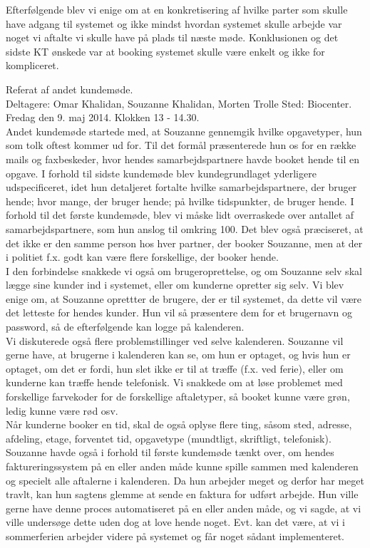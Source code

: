 \documentclass[12pt]{article}   %
\begin{document}
Efterfølgende blev vi enige om at en konkretisering af hvilke parter som skulle have adgang til systemet og ikke mindst hvordan systemet skulle arbejde var noget vi aftalte vi skulle have på plads til næste møde. Konklusionen og det sidste KT ønskede var at booking systemet skulle være enkelt og ikke for kompliceret. 

\newpage

Referat af andet kundemøde.\\

Deltagere: Omar Khalidan, Souzanne Khalidan, Morten Trolle
Sted: Biocenter. Fredag den 9. maj 2014. Klokken 13 - 14.30.\\

Andet kundemøde startede med, at Souzanne gennemgik hvilke opgavetyper, hun som tolk oftest kommer ud for. Til det formål præsenterede hun os for en række mails og faxbeskeder, hvor hendes samarbejdspartnere havde booket hende til en opgave. I forhold til sidste kundemøde blev kundegrundlaget yderligere udspecificeret, idet hun detaljeret fortalte hvilke samarbejdspartnere, der bruger hende; hvor mange, der bruger hende; på hvilke tidspunkter, de bruger hende. I forhold til det første kundemøde, blev vi måske lidt overraskede over antallet af samarbejdspartnere, som hun anslog til omkring 100. Det blev også præciseret, at det ikke er den samme person hos hver partner, der booker Souzanne, men at der i politiet f.x. godt kan være flere forskellige, der booker hende. \\
I den forbindelse snakkede vi også om brugeroprettelse, og om Souzanne selv skal lægge sine kunder ind i systemet, eller om kunderne opretter sig selv. Vi blev enige om, at Souzanne oprettter de brugere, der er til systemet, da dette vil være det letteste for hendes kunder. Hun vil så præsentere dem for et brugernavn og password, så de efterfølgende kan logge på kalenderen. \\
Vi diskuterede også flere problemstillinger ved selve kalenderen. Souzanne vil gerne have, at brugerne i kalenderen kan se, om hun er optaget, og hvis hun er optaget, om det er fordi, hun slet ikke er til at træffe (f.x. ved ferie), eller om kunderne kan træffe hende telefonisk. Vi snakkede om at løse problemet med forskellige farvekoder for de forskellige aftaletyper, så booket kunne være grøn, ledig kunne være rød osv. \\
Når kunderne booker en tid, skal de også oplyse flere ting, såsom sted, adresse, afdeling, etage, forventet tid, opgavetype (mundtligt, skriftligt, telefonisk). 
Souzanne havde også i forhold til første kundemøde tænkt over, om hendes faktureringssystem på en eller anden måde kunne spille sammen med kalenderen og specielt alle aftalerne i kalenderen. Da hun arbejder meget og derfor har meget travlt, kan hun sagtens glemme at sende en faktura for udført arbejde. Hun ville gerne have denne proces automatiseret på en eller anden måde, og vi sagde, at vi ville undersøge dette uden dog at love hende noget. Evt. kan det være, at vi i sommerferien arbejder videre på systemet og får noget sådant implementeret. \\
\end{document}
